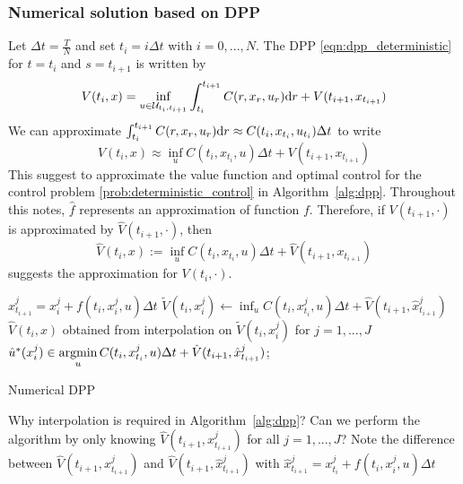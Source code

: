 \documentclass[11pt]{book}
\newcommand{\dr}{\text{\normalfont d}r}
\begin{document}
\subsubsection{Numerical solution based on DPP}
Let $\Delta t = \frac{T}{N}$ and set $t_i=i\Delta t$ with $i=0,...,N$. The DPP \eqref{eqn:dpp_deterministic} for $t=t_i$ and $s=t_{i+1}$ is written by
\begin{equation}
    V(t_{i},x) =\inf_{u\in\mathcal{U}_{t_i,t_{i+1}}}\int_{t_i}^{t_{i+1}}C(r,x_r,u_r){{\dr}}+V(t_{i+1},x_{t_{i+1}})
\end{equation}
We can approximate $\int_{t_i}^{t_{i+1}}C(r,x_r,u_r){{\dr}}\approx C(t_i,x_{t_i},u_{t_i})\Delta t$ to write
\begin{equation}
    V(t_{i},x) \approx\inf_{u}C(t_{i},x_{t_{i}},u){{\Delta t}}+V(t_{i+1},x_{t_{i+1}})
\end{equation}
This suggest to approximate the value function and optimal control for the control problem \eqref{prob:deterministic_control} in Algorithm~\ref{alg:dpp}. Throughout this notes, $\hat{f}$ represents an approximation of function $f$. 
Therefore, if $V(t_{i+1},\cdot)$ is approximated by  $\hat{V}(t_{i+1},\cdot)$, then 
\[
\hat{V}(t_{i},x):=\inf_{u}C(t_{i},x_{t_{i}},u){{\Delta t}}+\hat{V}(t_{i+1},x_{t_{i+1}})
\]
suggests the approximation for $V(t_{i},\cdot)$. 
\begin{algorithm}
        {$\hat{x}^j_{t_{i+1}} =x_i^j+f(t_{i},x_i^j,u)\Delta t$\;
        $\tilde{V}(t_{i},x^j_i)\leftarrow \inf_{u}C(t_{i},{x}^j_{t_{i}},u){{\Delta t}}+\hat{V}(t_{i+1},\hat{x}^j_{t_{i+1}})$\;
        $\hat{V}(t_{i},x)$ obtained from interpolation on $\tilde{V}(t_{i},x^j_i)$ for $j=1,...,J$\;
        $\hat{u}^*(x_i^j)\in\mathop{\text{\normalfont argmin}}\limits_{u}C(t_{i},{x}^j_{t_{i}},u){{\Delta t}}+\hat{V}(t_{i+1},\hat{x}^j_{t_{i+1}})$;
        }
        \caption{Numerical DPP}
         \label{alg:dpp}
\end{algorithm}
\begin{ex}
    Why interpolation is required in Algorithm~\ref{alg:dpp}? Can we perform the algorithm by only knowing  $\hat{V}(t_{i+1},{x}^j_{t_{i+1}})$ for all $j=1,...,J$? 
    Note the difference between $\hat{V}(t_{i+1},{x}^j_{t_{i+1}})$ and $\hat{V}(t_{i+1},\hat{x}^j_{t_{i+1}})$ with $\hat{x}^j_{t_{i+1}} = {x}^j_{t_i} + f(t_{i},x_i^j,u)\Delta t$
\end{ex}
\end{document}
